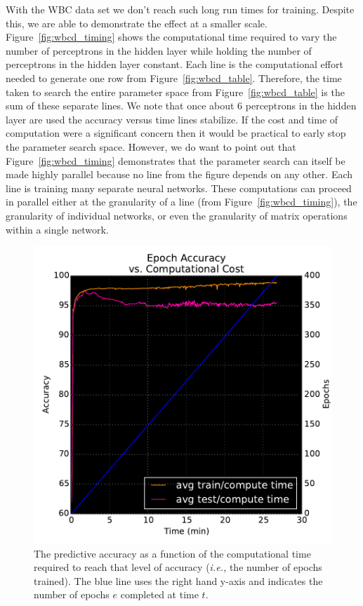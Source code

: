 With the WBC data set we don't reach such long run times for training.
Despite this, we are able to demonstrate the effect at a smaller scale.
Figure~\ref{fig:wbcd_timing} shows the computational time required to vary the number of perceptrons in the  hidden layer while holding the number of perceptrons in the  hidden layer constant.
Each line is the computational effort needed to generate one row from Figure~\ref{fig:wbcd_table}.
Therefore, the time taken to search the entire parameter space from Figure~\ref{fig:wbcd_table} is the sum of these separate lines.
We note that once about 6 perceptrons in the  hidden layer are used the accuracy versus time lines stabilize.
If the cost and time of computation were a significant concern then it would be practical to early stop the parameter search space.
However, we do want to point out that Figure~\ref{fig:wbcd_timing} demonstrates that the parameter search can itself be made highly parallel because no line from the figure depends on any other.
Each line is training many separate neural networks.
These computations can proceed in parallel either at the granularity of a line (from Figure~\ref{fig:wbcd_timing}), the granularity of individual networks, or even the granularity of matrix operations within a single network.

\begin{figure}[t]

\centering
\includegraphics[width=0.95\columnwidth]{figs/wbcd_timing_iterative}
\caption {The predictive accuracy as a function of the computational time required to reach that level of accuracy ({\em i.e.,} the number of epochs trained). The blue line uses the right hand y-axis and indicates the number of epochs \(e\) completed at time \(t\).}
\label{fig:wbcd_iterative_timing}

\end{figure}

